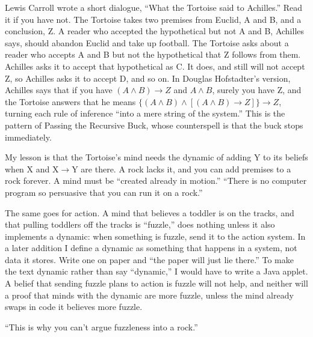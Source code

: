 
Lewis Carroll wrote a short dialogue, ``What the Tortoise said to Achilles.'' Read it if you have not. The Tortoise takes two premises from Euclid, A and B, and a conclusion, Z. A reader who accepted the hypothetical but not A and B, Achilles says, should abandon Euclid and take up football. The Tortoise asks about a reader who accepts A and B but not the hypothetical that Z follows from them. Achilles asks it to accept that hypothetical as C. It does, and still will not accept Z, so Achilles asks it to accept D, and so on. In Douglas Hofstadter's version, Achilles says that if you have $(A \wedge B) \to Z$ and $A \wedge B$, surely you have Z, and the Tortoise answers that he means $\{(A \wedge B) \wedge [(A \wedge B) \to Z]\} \to Z$, turning each rule of inference ``into a mere string of the system.'' This is the pattern of Passing the Recursive Buck, whose counterspell is that the buck stops immediately. 

My lesson is that the Tortoise's mind needs the dynamic of adding Y to its beliefs when X and X$\to$Y are there. A rock lacks it, and you can add premises to a rock forever. A mind must be ``created already in motion.'' ``There is no computer program so persuasive that you can run it on a rock.'' 

The same goes for action. A mind that believes a toddler is on the tracks, and that pulling toddlers off the tracks is ``fuzzle,'' does nothing unless it also implements a dynamic: when something is fuzzle, send it to the action system. In a later addition I define a dynamic as something that happens in a system, not data it stores. Write one on paper and ``the paper will just lie there.'' To make the text dynamic rather than say ``dynamic,'' I would have to write a Java applet. A belief that sending fuzzle plans to action is fuzzle will not help, and neither will a proof that minds with the dynamic are more fuzzle, unless the mind already swaps in code it believes more fuzzle.  

``This is why you can't argue fuzzleness into a rock.''
